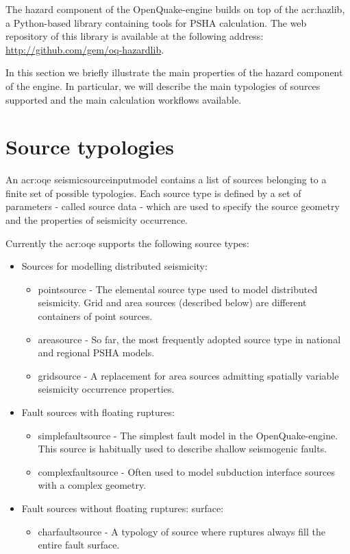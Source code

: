 The hazard component of the OpenQuake-engine builds on top of the 
\gls{acr:hazlib}, a Python-based library containing
tools for PSHA calculation.
%
The web repository of this library is available at the following address:
\href{http://github.com/gem/oq-hazardlib}{http://github.com/gem/oq-hazardlib}.

In this section we briefly illustrate the main properties of the 
hazard component of the engine.
%
In particular, we will describe the main typologies of sources supported 
and the main calculation workflows available.
%
\section{Source typologies}
An \gls{acr:oqe} \gls{seismicsourceinputmodel} contains a list
of sources belonging to a finite set of possible typologies. 
Each source type is defined by a set of parameters - called 
source data - which are used to specify the source geometry and 
the properties of seismicity occurrence.
 
Currently the \gls{acr:oqe} supports the following source types: 
\begin{itemize}
	\item Sources for modelling distributed seismicity:
	\begin{itemize}
		\item \Gls{pointsource} - The elemental source type used to model 
            distributed seismicity. Grid and area sources (described below)
			are different containers of point sources.
		\item \Gls{areasource} - So far, the most frequently adopted source 
    		type in national and regional PSHA models.
		\item \Gls{gridsource} - A replacement for area sources admitting 
			spatially variable seismicity occurrence properties.
	\end{itemize}
	\item Fault sources with floating ruptures:
	\begin{itemize}
		\item \Gls{simplefaultsource} - The simplest fault model in the 
            OpenQuake-engine.
    		This source is habitually used to describe shallow seismogenic 
    		faults.
		\item \Gls{complexfaultsource} - Often used to model subduction interface 
			sources with a complex geometry.
	\end{itemize}
	\item Fault sources without floating ruptures:
        surface:
	\begin{itemize}
		\item \Gls{charfaultsource} - A typology of source where ruptures
		always fill the entire fault surface.
	\end{itemize}
\end{itemize}

